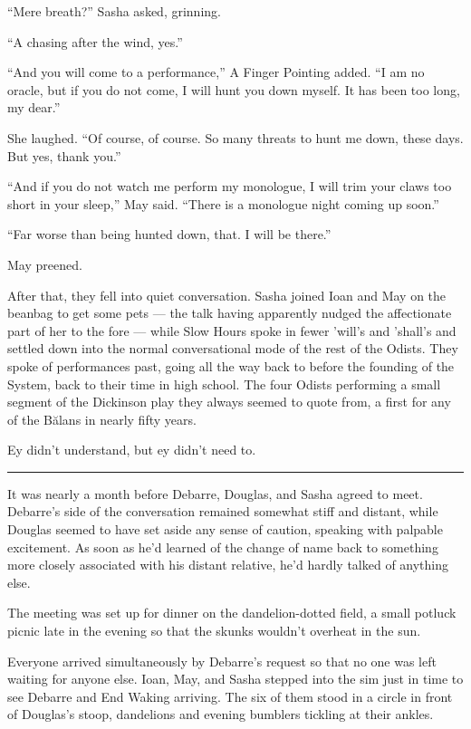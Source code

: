 ``Mere breath?'' Sasha asked, grinning.

``A chasing after the wind, yes.''

``And you will come to a performance,'' A Finger Pointing added. ``I am no oracle, but if you do not come, I will hunt you down myself. It has been too long, my dear.''

She laughed. ``Of course, of course. So many threats to hunt me down, these days. But yes, thank you.''

``And if you do not watch me perform my monologue, I will trim your claws too short in your sleep,'' May said. ``There is a monologue night coming up soon.''

``Far worse than being hunted down, that. I will be there.''

May preened.

After that, they fell into quiet conversation. Sasha joined Ioan and May on the beanbag to get some pets — the talk having apparently nudged the affectionate part of her to the fore — while Slow Hours spoke in fewer 'will's and 'shall's and settled down into the normal conversational mode of the rest of the Odists. They spoke of performances past, going all the way back to before the founding of the System, back to their time in high school. The four Odists performing a small segment of the Dickinson play they always seemed to quote from, a first for any of the Bălans in nearly fifty years.

Ey didn't understand, but ey didn't need to.

\begin{center}\rule{0.5\linewidth}{0.5pt}\end{center}

It was nearly a month before Debarre, Douglas, and Sasha agreed to meet. Debarre's side of the conversation remained somewhat stiff and distant, while Douglas seemed to have set aside any sense of caution, speaking with palpable excitement. As soon as he'd learned of the change of name back to something more closely associated with his distant relative, he'd hardly talked of anything else.

The meeting was set up for dinner on the dandelion-dotted field, a small potluck picnic late in the evening so that the skunks wouldn't overheat in the sun.

Everyone arrived simultaneously by Debarre's request so that no one was left waiting for anyone else. Ioan, May, and Sasha stepped into the sim just in time to see Debarre and End Waking arriving. The six of them stood in a circle in front of Douglas's stoop, dandelions and evening bumblers tickling at their ankles.

